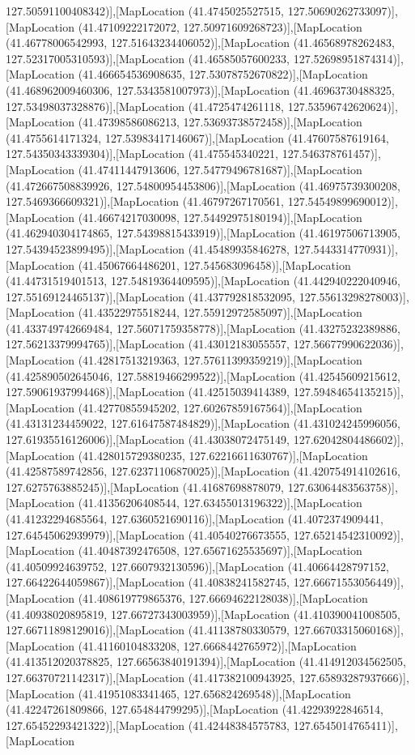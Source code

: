127.50591100408342)],[MapLocation (41.4745025527515, 127.50690262733097)],[MapLocation (41.47109222172072, 127.50971609268723)],[MapLocation (41.46778006542993, 127.51643234406052)],[MapLocation (41.46568978262483, 127.52317005310593)],[MapLocation (41.46585057600233, 127.52698951874314)],[MapLocation (41.466654536908635, 127.53078752670822)],[MapLocation (41.468962009460306, 127.5343581007973)],[MapLocation (41.46963730488325, 127.53498037328876)],[MapLocation (41.4725474261118, 127.53596742620624)],[MapLocation (41.47398586086213, 127.53693738572458)],[MapLocation (41.4755614171324, 127.53983417146067)],[MapLocation (41.47607587619164, 127.54350343339304)],[MapLocation (41.475545340221, 127.546378761457)],[MapLocation (41.47411447913606, 127.54779496781687)],[MapLocation (41.472667508839926, 127.54800954453806)],[MapLocation (41.46975739300208, 127.5469366609321)],[MapLocation (41.46797267170561, 127.54549899690012)],[MapLocation (41.46674217030098, 127.54492975180194)],[MapLocation (41.462940304174865, 127.54398815433919)],[MapLocation (41.46197506713905, 127.54394523899495)],[MapLocation (41.45489935846278, 127.5443314770931)],[MapLocation (41.45067664486201, 127.545683096458)],[MapLocation (41.44731519401513, 127.54819364409595)],[MapLocation (41.442940222040946, 127.55169124465137)],[MapLocation (41.437792818532095, 127.55613298278003)],[MapLocation (41.43522975518244, 127.55912972585097)],[MapLocation (41.433749742669484, 127.56071759358778)],[MapLocation (41.43275232389886, 127.56213379994765)],[MapLocation (41.43012183055557, 127.56677990622036)],[MapLocation (41.42817513219363, 127.57611399359219)],[MapLocation (41.425890502645046, 127.58819466299522)],[MapLocation (41.42545609215612, 127.59061937994468)],[MapLocation (41.42515039414389, 127.59484654135215)],[MapLocation (41.42770855945202, 127.60267859167564)],[MapLocation (41.43131234459022, 127.61647587484829)],[MapLocation (41.431024245996056, 127.61935516126006)],[MapLocation (41.43038072475149, 127.62042804486602)],[MapLocation (41.428015729380235, 127.62216611630767)],[MapLocation (41.42587589742856, 127.62371106870025)],[MapLocation (41.420754914102616, 127.6275763885245)],[MapLocation (41.41687698878079, 127.63064483563758)],[MapLocation (41.41356206408544, 127.63455013196322)],[MapLocation (41.41232294685564, 127.6360521690116)],[MapLocation (41.4072374909441, 127.64545062939979)],[MapLocation (41.40540276673555, 127.65214542310092)],[MapLocation (41.40487392476508, 127.65671625535697)],[MapLocation (41.40509924639752, 127.6607932130596)],[MapLocation (41.40664428797152, 127.66422644059867)],[MapLocation (41.40838241582745, 127.66671553056449)],[MapLocation (41.408619779865376, 127.66694622128038)],[MapLocation (41.40938020895819, 127.66727343003959)],[MapLocation (41.410390041008505, 127.66711898129016)],[MapLocation (41.41138780330579, 127.66703315060168)],[MapLocation (41.41160104833208, 127.6668442765972)],[MapLocation (41.413512020378825, 127.66563840191394)],[MapLocation (41.414912034562505, 127.66370721142317)],[MapLocation (41.417382100943925, 127.65893287937666)],[MapLocation (41.41951083341465, 127.656824269548)],[MapLocation (41.42247261809866, 127.654844799295)],[MapLocation (41.42293922846514, 127.65452293421322)],[MapLocation (41.42448384575783, 127.6545014765411)],[MapLocation 